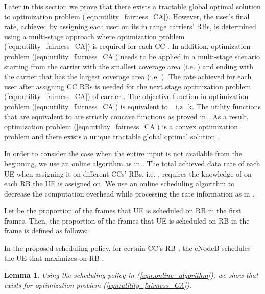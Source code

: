 \documentclass[conference]{IEEEtran}
\newtheorem{lem}[thm]{Lemma}
\begin{document}
Later in this section we prove that there exists a tractable global optimal solution to optimization problem (\ref{eqn:utility_fairness_CA}). However, the user's final rate, achieved by assigning each user on its in range carriers' RBs, is determined using a multi-stage approach where optimization problem (\ref{eqn:utility_fairness_CA}) is required for each CC . In addition, optimization problem (\ref{eqn:utility_fairness_CA}) needs to be applied in a multi-stage scenario starting from the carrier with the smallest coverage area (i.e. ) and ending with the carrier that has the largest coverage area (i.e. ). The rate achieved for each user after assigning CC  RBs is needed for the next stage optimization problem (\ref{eqn:utility_fairness_CA}) of carrier . The objective function in optimization problem (\ref{eqn:utility_fairness_CA}) is equivalent to \phi_{i,z_k}. The utility functions  that are equivalent to  are strictly concave functions as proved in \cite{Ahmed_Utility1}. As a result, optimization problem (\ref{eqn:utility_fairness_CA}) is a convex optimization problem and there exists a unique tractable global optimal solution \cite{Ahmed_Utility1,Haya_Utility1}.


In order to consider the case when the entire input is not available from the beginning, we use an online algorithm as in \cite{SelfOrganizedLTE,Tugba-RB}. The total achieved data rate of each UE when assigning it on different CCs' RBs, i.e. , requires the knowledge of  on each RB  the UE is assigned on. We use an online scheduling algorithm to decrease the computation overhead while processing the rate information as in \cite{SelfOrganizedLTE}.

Let  be the proportion of the frames that UE  is scheduled on RB  in the first  frames. Then, the proportion of the frames that UE  is scheduled on RB  in the  frame is defined as follows:
\vspace{-0.5em}


In the proposed scheduling policy, for certain CC's RB , the eNodeB schedules the UE that maximizes  on RB .

\begin{lem}\label{lem:optimality}  Using the scheduling policy in (\ref{eqn:online_algorithm}), we show that  exists for optimization problem (\ref{eqn:utility_fairness_CA}).
\end{lem}
\end{document}
